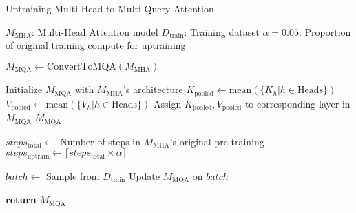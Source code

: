 \begin{algorithm}
\caption{Uptraining Multi-Head to Multi-Query Attention}
\begin{algorithmic}[1]

\Require $M_{\text{MHA}}$: Multi-Head Attention model
\Require $D_{\text{train}}$: Training dataset
\Require $\alpha = 0.05$: Proportion of original training compute for uptraining

\State $M_{\text{MQA}} \gets \text{ConvertToMQA}(M_{\text{MHA}})$

    \State Initialize $M_{\text{MQA}}$ with $M_{\text{MHA}}$'s architecture
        \State $K_{\text{pooled}} \gets \text{mean}(\{K_{h} | h \in \text{Heads}\})$
        \State $V_{\text{pooled}} \gets \text{mean}(\{V_{h} | h \in \text{Heads}\})$
        \State Assign $K_{\text{pooled}}, V_{\text{pooled}}$ to corresponding layer in $M_{\text{MQA}}$
    \EndFor
    \State \Return $M_{\text{MQA}}$
\EndFunction

\State $steps_{\text{total}} \gets$ Number of steps in $M_{\text{MHA}}$'s original pre-training
\State $steps_{\text{uptrain}} \gets \lceil steps_{\text{total}} \times \alpha \rceil$

    \State $batch \gets$ Sample from $D_{\text{train}}$
    \State Update $M_{\text{MQA}}$ on $batch$ 
\EndFor

\State \textbf{return} $M_{\text{MQA}}$

\end{algorithmic}
\end{algorithm}
